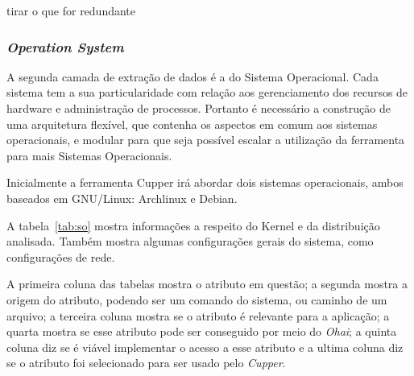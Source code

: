 {\color{red} tirar o que for redundante}


\subsubsection{\textit{Operation System}}
\label{sec:cam-os}

A segunda camada de extração de dados é a do Sistema Operacional. 
Cada sistema tem a sua particularidade com relação aos gerenciamento dos 
recursos de hardware e administração de processos. Portanto é necessário a 
construção de uma arquitetura flexível, que contenha os aspectos em comum aos
sistemas operacionais, e modular para que seja possível escalar a utilização 
da ferramenta para mais Sistemas Operacionais.

Inicialmente a ferramenta Cupper irá abordar dois sistemas operacionais, 
ambos baseados em GNU/Linux: Archlinux e Debian.

A tabela~\ref{tab:so} mostra informações a respeito do Kernel e da distribuição
analisada. Também mostra algumas configurações gerais do sistema, como
configurações de rede.

A primeira coluna das tabelas mostra o atributo em questão; a segunda mostra
a origem do atributo, podendo ser um comando do sistema, ou caminho de um arquivo;
a terceira coluna mostra se o atributo é relevante para a aplicação; a quarta mostra se
esse atributo pode ser conseguido por meio do \textit{Ohai}; a quinta coluna 
diz se é viável implementar o acesso a esse atributo e a ultima coluna
diz se o atributo foi selecionado para ser usado pelo \textit{Cupper}.

